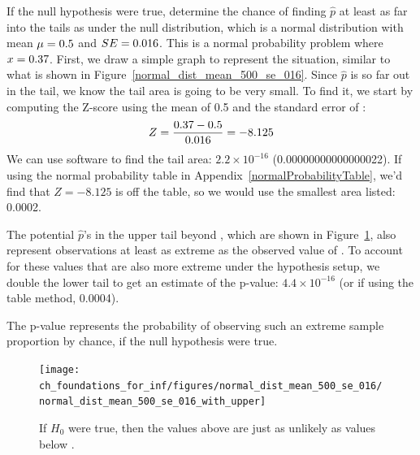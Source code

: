 \begin{examplewrap}
\begin{nexample}{If the null hypothesis were true,
    determine the chance of finding $\hat{p}$ at least
    as far into the tails as \pewcoalpollprop{}
    under the null distribution,
    which is a normal distribution with mean
    $\mu = 0.5{}$
    and $SE = 0.016{}$.}
%
  This is a normal probability problem where
  $x = 0.37{}$.
  First, we draw a simple graph to represent the situation,
  similar to what is shown in
  Figure~\ref{normal_dist_mean_500_se_016}.
  Since $\hat{p}$ is so far out in the tail, we know the
  tail area is going to be very small. To find it, we start
  by computing the Z-score using the mean of 0.5 and the
  standard error of \pewcoalpollnullse{}:
  \begin{align*}
  Z = \frac{0.37{} - 0.5}{0.016{}} = -8.125 
  \end{align*}
  We can use software to find the tail area:
  $2.2 \times 10^{-16}$
  (0.00000000000000022).
  If using the normal probability table in
  Appendix~\ref{normalProbabilityTable},
  we'd find that $Z = -8.125$ is off the table,
  so we would use the smallest area listed: 0.0002.

  The potential $\hat{p}$'s in the upper tail beyond
  \pewcoalpollpropcomplement{}, which are shown
  in Figure~\ref{normal_dist_mean_500_se_016_with_upper},
  also represent observations at least as extreme as
  the observed value of \pewcoalpollprop{}.
  To account for these values that are also more
  extreme under the hypothesis setup,
  we double the lower tail to get an estimate
  of the p-value: $4.4 \times 10^{-16}$
  (or if using the table method, 0.0004).

  The p-value represents the probability of observing
  such an extreme sample proportion by chance, if the null
  hypothesis were true.
\end{nexample}
\end{examplewrap}

\begin{figure}[h]
\centering
\texttt{[image: ch\_foundations\_for\_inf/figures/normal\_dist\_mean\_500\_se\_016/normal\_dist\_mean\_500\_se\_016\_with\_upper]}
\caption{
  If $H_0$ were true, then the values above
  \pewcoalpollpropcomplement{} are just
  as unlikely as values below \pewcoalpollprop{}.}
\label{normal_dist_mean_500_se_016_with_upper}
\end{figure}




